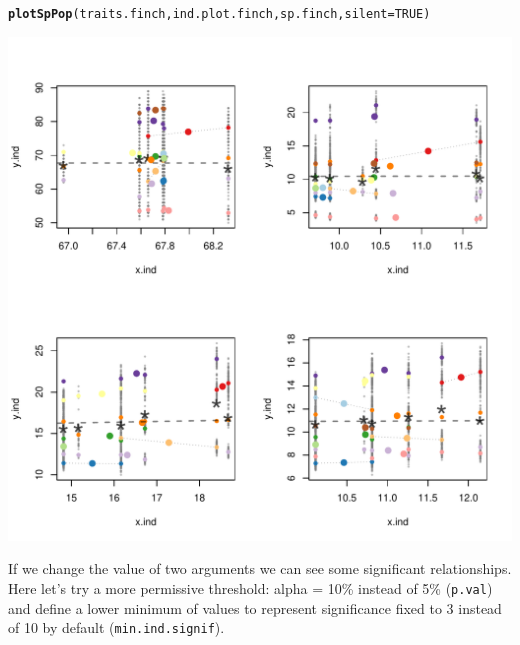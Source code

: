 \documentclass[12pt]{article}\usepackage[]{graphicx}\usepackage[]{color}
\makeatletter
\def\maxwidth{ %
  \ifdim\Gin@nat@width>\linewidth
    \linewidth
  \else
    \Gin@nat@width
  \fi
}
\newcommand{\hlnum}[1]{\textcolor[rgb]{0.686,0.059,0.569}{#1}}%
\newcommand{\hlstd}[1]{\textcolor[rgb]{0.345,0.345,0.345}{#1}}%
\newcommand{\hlkwc}[1]{\textcolor[rgb]{0.333,0.667,0.333}{#1}}%
\newcommand{\hlkwd}[1]{\textcolor[rgb]{0.737,0.353,0.396}{\textbf{#1}}}%
\newenvironment{kframe}{%
 \def\at@end@of@kframe{}%
 \ifinner\ifhmode%
  \def\at@end@of@kframe{\end{minipage}}%
  \begin{minipage}{\columnwidth}%
 \fi\fi%
 \def\FrameCommand##1{\hskip\@totalleftmargin \hskip-\fboxsep
 \colorbox{shadecolor}{##1}\hskip-\fboxsep
     \hskip-\linewidth \hskip-\@totalleftmargin \hskip\columnwidth}%
 \MakeFramed {\advance\hsize-\width
   \@totalleftmargin\z@ \linewidth\hsize
   \@setminipage}}%
 {\par\unskip\endMakeFramed%
 \at@end@of@kframe}
\newenvironment{knitrout}{}{} %
\makeatother
\begin{document}
\begin{knitrout}
\color{fgcolor}\begin{kframe}
\begin{alltt}
\hlkwd{plotSpPop}\hlstd{(traits.finch, ind.plot.finch, sp.finch,} \hlkwc{silent} \hlstd{=} \hlnum{TRUE}\hlstd{)}
\end{alltt}
\end{kframe}
\includegraphics[width=\maxwidth]{figure/unnamed-chunk-27} 

\end{knitrout}

If we change the value of two arguments we can see some significant relationships. Here let's try a more permissive threshold: alpha = 10\% instead of 5\% (\texttt{p.val}) and define a lower minimum of values to represent significance  fixed to 3 instead of 10 by default (\texttt{min.ind.signif}). 

\newpage
\end{document}
